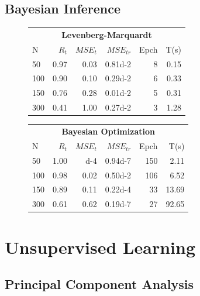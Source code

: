 \documentclass[a4paper, 10pt]{article}
\begin{document}
\subsection{Bayesian Inference}
  \begin{figure}[h]
    \centering
    \hfill
    \begin{tabular}{@{}lrrrrr@{}}
      \toprule
      \multicolumn{6}{c}{\textbf{Levenberg-Marquardt}} \\
      N  &   $R_t$  &  $MSE_t$ &  $MSE_{tr}$ & Epch  & T(s)\\
      \midrule
      50   &   0.97    &   0.03    &  \num{0.81d-2}  &  8   &  0.15  \\
      100  &   0.90    &   0.10    &  \num{0.29d-2}  &  6   &  0.33  \\
      150  &   0.76    &   0.28    &  \num{0.01d-2}  &  5   &  0.31  \\
      300  &   0.41    &   1.00    &  \num{0.27d-2}  &  3   &  1.28  \\
      \bottomrule
    \end{tabular} 
    \hfill
    \begin{tabular}{@{}lrrrrr@{}}
      \toprule
      \multicolumn{6}{c}{\textbf{Bayesian Optimization}} \\
      N  &   $R_t$  &  $MSE_t$ & $MSE_{tr}$  & Epch  & T(s)\\
      \midrule
      50   &   1.00    &   \num{d-4}  &  \num{0.94d-7}   & 150   &    2.11  \\
      100  &   0.98    &   0.02       &  \num{0.50d-2}   & 106   &    6.52  \\
      150  &   0.89    &   0.11       &  \num{0.22d-4}   &  33   &   13.69  \\
      300  &   0.61    &   0.62       &  \num{0.19d-7}   &  27   &   92.65  \\
      \bottomrule
    \end{tabular}  \hfill\mbox{}
    \caption{}
    \label{fig:bayes}
  \end{figure}

  





\newpage
\section{Unsupervised Learning}
  \subsection{Principal Component Analysis}
\end{document}
